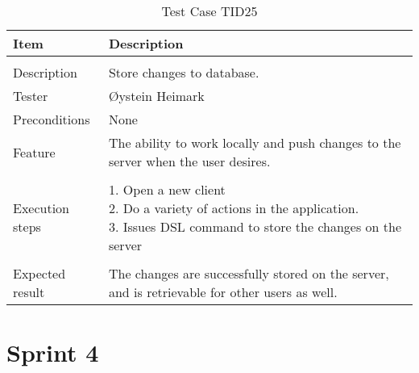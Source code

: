 \begin{table}[H]
\caption{Test Case TID25}
\centering
\begin{tabular}{ l p{13cm} }
\hline
 Item            & Description        \\
\hline \\ [-2.0ex]
 Description     &Store changes to database. \\
 Tester          & Øystein Heimark                  \\
 Preconditions   & None\\
 Feature         & The ability to work locally and push changes to the server when the user desires.   \vspace{3pt}                     \\
\hline \\ [-1.5ex]
 Execution steps & \pbox{13cm}{1. Open a new client \\ 2. Do a variety of actions in the application. \\ 3. Issues DSL command to store the changes on the server} \vspace{3pt} \\
\hline \\ [-1.5ex]
 Expected result & The changes are successfully stored on the server, and is retrievable for other users as well. \\
\hline
\end{tabular}
\label{table:testcasetid25}
\end{table}

\clearpage


\section{Sprint 4}
\label{sec:sp4testcases}


